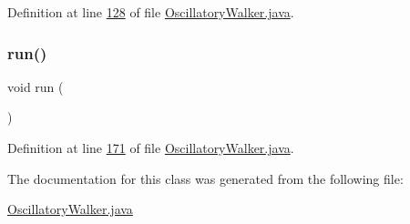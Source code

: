 Definition at line \hyperlink{_oscillatory_walker_8java_source_l00128}{128} of file \hyperlink{_oscillatory_walker_8java_source}{Oscillatory\+Walker.\+java}.

\hypertarget{classdata_1_1_oscillatory_walker_a13a43e6d814de94978c515cb084873b1}{}\label{classdata_1_1_oscillatory_walker_a13a43e6d814de94978c515cb084873b1} 
\subsubsection{\texorpdfstring{run()}{run()}}
{\footnotesize\ttfamily void run (\begin{DoxyParamCaption}{ }\end{DoxyParamCaption})}



Definition at line \hyperlink{_oscillatory_walker_8java_source_l00171}{171} of file \hyperlink{_oscillatory_walker_8java_source}{Oscillatory\+Walker.\+java}.



The documentation for this class was generated from the following file\+:\begin{DoxyCompactItemize}
\item 
\hyperlink{_oscillatory_walker_8java}{Oscillatory\+Walker.\+java}\end{DoxyCompactItemize}
